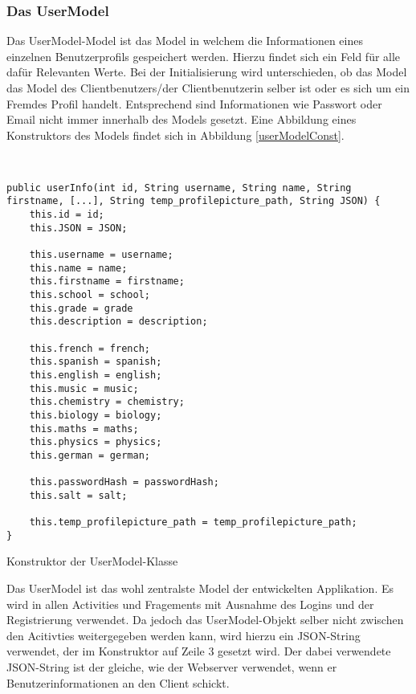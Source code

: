 \documentclass[../main.tex]{subfiles}
\begin{document}
	\subsubsection{Das UserModel}
	Das UserModel-Model ist das Model in welchem die Informationen eines einzelnen Benutzerprofils gespeichert werden. Hierzu findet sich ein Feld für alle dafür Relevanten Werte. Bei der Initialisierung wird unterschieden, ob das Model das Model des Clientbenutzers/der Clientbenutzerin selber ist oder es sich um ein Fremdes Profil handelt. Entsprechend sind Informationen wie Passwort oder Email nicht immer innerhalb des Models gesetzt. Eine Abbildung eines Konstruktors des Models findet sich in Abbildung \ref{userModelConst}.
	
	\begin{code}
	\begin{center}
		\begin{verbatim}
		
	
public userInfo(int id, String username, String name, String firstname, [...], String temp_profilepicture_path, String JSON) {
	this.id = id;
	this.JSON = JSON;

	this.username = username;
	this.name = name;
	this.firstname = firstname;
	this.school = school;
	this.grade = grade
	this.description = description;
	
	this.french = french;
	this.spanish = spanish;
	this.english = english;
	this.music = music;
	this.chemistry = chemistry;
	this.biology = biology;
	this.maths = maths;
	this.physics = physics;
	this.german = german;
	
	this.passwordHash = passwordHash;
	this.salt = salt;

	this.temp_profilepicture_path = temp_profilepicture_path;
}
		\end{verbatim}
		\caption{Konstruktor der UserModel-Klasse}
		\label{userModelConst}
	\end{center}
	
\end{code}
	Das UserModel ist das wohl zentralste Model der entwickelten Applikation. Es wird in allen Activities und Fragements mit Ausnahme des Logins und der Registrierung verwendet. Da jedoch das UserModel-Objekt selber nicht zwischen den Acitivties weitergegeben werden kann, wird hierzu ein JSON-String verwendet, der im Konstruktor auf Zeile 3 gesetzt wird. Der dabei verwendete JSON-String ist der gleiche, wie der Webserver verwendet, wenn er Benutzerinformationen an den Client schickt.
	
\end{document}
